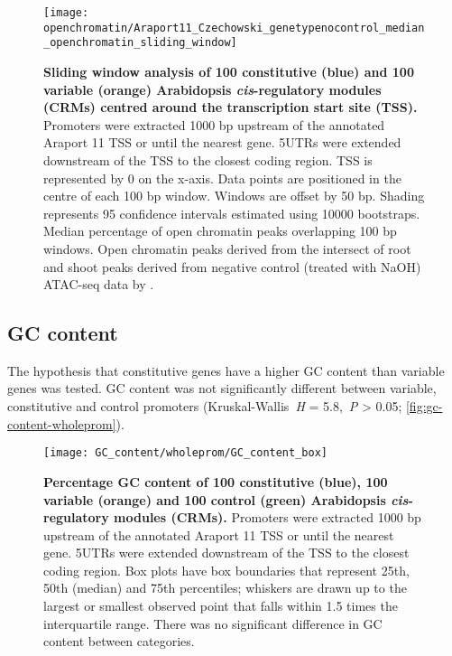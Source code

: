 \documentclass[../main.tex]{subfiles}
\begin{document}
\begin{figure}[!hbt]
	\begin{center}
		\capstart
		\texttt{[image: openchromatin/Araport11\_Czechowski\_genetypenocontrol\_median\_openchromatin\_sliding\_window]}
		\caption{
			\textbf{Sliding window analysis of 100 constitutive (blue) and 100 variable (orange) Arabidopsis \textit{cis}\hyp{}regulatory modules (CRMs) centred around the transcription start site (TSS).}
			Promoters were extracted 1000 bp upstream of the annotated Araport 11 \autocite{chengAraport11CompleteReannotation2017} TSS or until the nearest gene.
			5UTRs were extended downstream of the TSS to the closest coding region.
			TSS is represented by 0 on the x-axis.
			Data points are positioned in the centre of each 100 bp window.
			Windows are offset by 50 bp.
			Shading represents 95 confidence intervals estimated using 10000 bootstraps.
			Median percentage of open chromatin peaks overlapping 100 bp windows. Open chromatin peaks derived from the intersect of root and shoot peaks derived from negative control (treated with NaOH) ATAC\hyp{}seq data by \textcite{potterCytokininModulatesContextdependent2018}.		
			\label{fig:openchrom-sliding-window-araporttss}
		}
	\end{center}
\end{figure}


\subsection{GC content}
The hypothesis that constitutive genes have a higher GC content than variable genes was tested.
GC content was not significantly different between variable, constitutive and control promoters (Kruskal\hyp{}Wallis~\textit{H} = 5.8,~\textit{P} \textgreater{} 0.05; \autoref{fig:gc-content-wholeprom}).

\begin{figure}[hbt!]
	\begin{center}
		\capstart
		\texttt{[image: GC\_content/wholeprom/GC\_content\_box]}
		\caption{
			\textbf{Percentage GC content of 100 constitutive (blue), 100 variable (orange) and 100 control (green) Arabidopsis \textit{cis}\hyp{}regulatory modules (CRMs).}
			Promoters were extracted 1000 bp upstream of the annotated Araport 11 \autocite{chengAraport11CompleteReannotation2017} TSS or until the nearest gene.
			5UTRs were extended downstream of the TSS to the closest coding region.  Box plots have box boundaries that represent 25th, 50th (median) and 75th percentiles; whiskers are drawn up to the largest or smallest observed point that falls within 1.5 times the interquartile range.
			There was no significant difference in GC content between categories.
			\label{fig:gc-content-wholeprom}
		}
	\end{center}
\end{figure}
\end{document}
